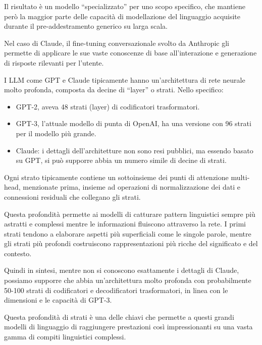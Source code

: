             Il risultato è un modello ``specializzato'' per uno scopo specifico, che mantiene però la maggior parte delle capacità di modellazione del linguaggio acquisite durante il pre-addestramento generico su larga scala.
            
            Nel caso di Claude, il fine-tuning conversazionale svolto da Anthropic gli permette di applicare le sue vaste conoscenze di base all'interazione e generazione di risposte rilevanti per l'utente.
            
            I LLM come GPT e Claude tipicamente hanno un'architettura di rete neurale molto profonda, composta da decine di ``layer'' o strati. Nello specifico:
            \begin{itemize}
                \item GPT-2, aveva 48 strati (layer) di codificatori trasformatori.
                
                \item GPT-3, l'attuale modello di punta di OpenAI, ha una versione con 96 strati per il modello più grande.
                
                \item Claude: i dettagli dell’architetture non sono resi pubblici, ma essendo basato su GPT, si può supporre abbia un numero simile di decine di strati.
            \end{itemize}
            
            Ogni strato tipicamente contiene un sottoinsieme dei punti di attenzione multi-head, menzionate prima, insieme ad operazioni di normalizzazione dei dati e connessioni residuali che collegano gli strati.
            
            Questa profondità permette ai modelli di catturare pattern linguistici sempre più astratti e complessi mentre le informazioni fluiscono attraverso la rete. I primi strati tendono a elaborare aspetti più superficiali come le singole parole, mentre gli strati più profondi costruiscono rappresentazioni più ricche del significato e del contesto.
            
            Quindi in sintesi, mentre non si conoscono esattamente i dettagli di Claude, possiamo supporre che abbia un'architettura molto profonda con probabilmente 50-100 strati di codificatori e decodificatori trasformatori, in linea con le dimensioni e le capacità di GPT-3.
            
            Questa profondità di strati è una delle chiavi che permette a questi grandi modelli di linguaggio di raggiungere prestazioni così impressionanti su una vasta gamma di compiti linguistici complessi.
            
